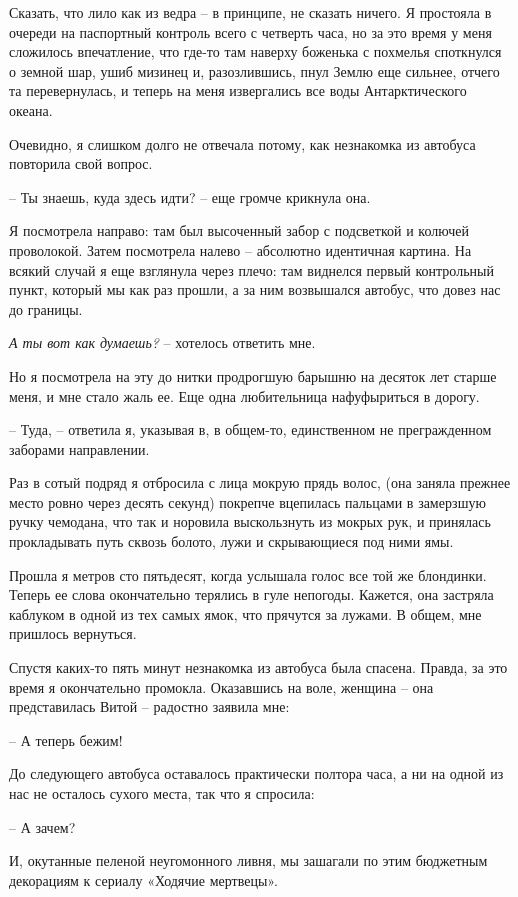 \documentclass[
]{book}
\begin{document}
Сказать, что лило как из ведра -- в принципе, не сказать ничего. Я простояла в очереди на паспортный контроль всего с четверть часа, но за это время у меня сложилось впечатление, что где-то там наверху боженька с похмелья споткнулся о земной шар, ушиб мизинец и, разозлившись, пнул Землю еще сильнее, отчего та перевернулась, и теперь на меня извергались все воды Антарктического океана.

Очевидно, я слишком долго не отвечала потому, как незнакомка из автобуса повторила свой вопрос.

-- Ты знаешь, куда здесь идти? -- еще громче крикнула она.

Я посмотрела направо: там был высоченный забор с подсветкой и колючей проволокой. Затем посмотрела налево -- абсолютно идентичная картина. На всякий случай я еще взглянула через плечо: там виднелся первый контрольный пункт, который мы как раз прошли, а за ним возвышался автобус, что довез нас до границы.

\emph{А ты вот как думаешь?} -- хотелось ответить мне.

Но я посмотрела на эту до нитки продрогшую барышню на десяток лет старше меня, и мне стало жаль ее. Еще одна любительница нафуфыриться в дорогу.

-- Туда, -- ответила я, указывая в, в общем-то, единственном не прегражденном заборами направлении.

Раз в сотый подряд я отбросила с лица мокрую прядь волос, (она заняла прежнее место ровно через десять секунд) покрепче вцепилась пальцами в замерзшую ручку чемодана, что так и норовила выскользнуть из мокрых рук, и принялась прокладывать путь сквозь болото, лужи и скрывающиеся под ними ямы.

Прошла я метров сто пятьдесят, когда услышала голос все той же блондинки. Теперь ее слова окончательно терялись в гуле непогоды. Кажется, она застряла каблуком в одной из тех самых ямок, что прячутся за лужами. В общем, мне пришлось вернуться.

Спустя каких-то пять минут незнакомка из автобуса была спасена. Правда, за это время я окончательно промокла. Оказавшись на воле, женщина -- она представилась Витой -- радостно заявила мне:

-- А теперь бежим!

До следующего автобуса оставалось практически полтора часа, а ни на одной из нас не осталось сухого места, так что я спросила:

-- А зачем?

И, окутанные пеленой неугомонного ливня, мы зашагали по этим бюджетным декорациям к сериалу «Ходячие мертвецы».
\end{document}
